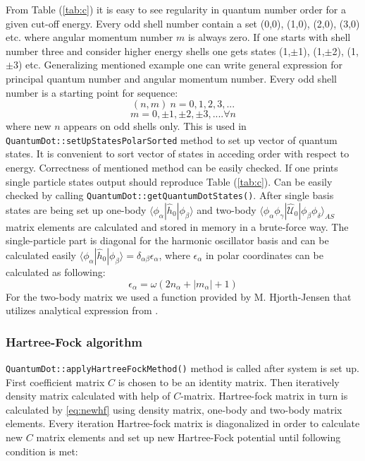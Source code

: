 \documentclass[10pt]{article}
\newcommand*{\hatU}{\hat{\mathcal{U}}}
\newcommand{\code}[1]{\colorbox{coding}{\texttt{#1}}}
\begin{document}
From Table (\ref{tab:c}) it is easy to see regularity in quantum number order for a given cut-off energy. Every odd shell number contain a set (0,0), (1,0), (2,0), (3,0) etc. where angular momentum number $m$ is always zero.
If one starts with shell number three and consider higher energy shells one gets states (1,$\pm$1), (1,$\pm$2), (1,$\pm$3) etc.
Generalizing mentioned example one can write general expression for principal quantum number and angular momentum number.
Every odd shell number is a starting point for sequence:
\[
(n, m)\ 
n = 0, 1, 2, 3, ... 
\]
\[
m = 0, \pm 1, \pm 2, \pm 3, .... \forall  n
\]
where new $n$ appears on odd shells only.
This is used in \code{QuantumDot::setUpStatesPolarSorted} method to set up vector of quantum states. It is convenient to sort vector of states in acceding order with respect to energy.
Correctness of mentioned method can be easily checked. If one prints single particle states output should reproduce Table (\ref{tab:c}). Can be easily checked by calling \code{QuantumDot::getQuantumDotStates()}.
After single basis states are being set up one-body $\langle \phi_{\alpha} | \hat{h}_0 | \phi_{\beta} \rangle$ and two-body $\langle \phi_{\alpha}\phi_{\gamma}|\hatU_{0}|\phi_{\beta}\phi_{\delta}\rangle_{AS}$ matrix elements are calculated and stored in memory in a brute-force way. The single-particle part is diagonal for the harmonic oscillator basis and can be calculated easily $\langle \phi_{\alpha} | \hat{h}_0 | \phi_{\beta} \rangle = \delta_{\alpha\beta}\epsilon_{\alpha}$, where $\epsilon_{\alpha}$ in polar coordinates can be calculated as following:
\[
\epsilon_{\alpha} = \omega(2n_{\alpha} + |m_{\alpha}| + 1)
\]
For the two-body matrix we used a function provided by M. Hjorth-Jensen that utilizes analytical expression from \cite{Anisimovas}.  

\subsubsection{Hartree-Fock algorithm}

\code{QuantumDot::applyHartreeFockMethod()} method is called after system is set up. First coefficient matrix $C$ is chosen to be an identity matrix.
Then iteratively density matrix calculated with help of $C$-matrix. Hartree-fock matrix in turn is calculated by \ref{eq:newhf} using density matrix, one-body and two-body matrix elements.
Every iteration Hartree-fock matrix is diagonalized in order to calculate new $C$ matrix elements and set up new Hartree-Fock potential until following condition is met:
\end{document}

